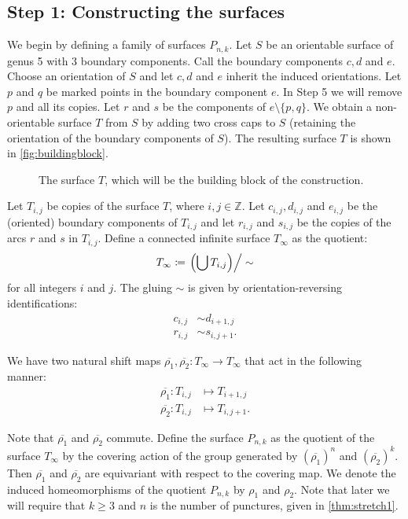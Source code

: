 \subsection*{Step 1: Constructing the surfaces}

We begin by defining a family of surfaces $P_{n,k}$. Let $S$ be an orientable surface of genus 5 with 3
boundary components.  Call the boundary components $c,d$ and $e$. Choose an orientation of $S$ and let $c,d$ and $e$ inherit the induced orientations. Let $p$ and $q$ be marked points in the boundary component $e$. In Step 5 we will remove $p$ and all its copies.  Let  $r$ and
$s$ be the components of $e\setminus\{p,q\}$. We obtain a non-orientable surface $T$ from $S$ by adding two cross caps to $S$ (retaining the orientation of the boundary components of $S$).  The resulting surface $T$ is shown in \autoref{fig:buildingblock}.

\begin{figure}[ht]
    \centering
    \caption{The surface $T$, which will be the building block of the construction.}
    \label{fig:buildingblock}
\end{figure}

Let $T_{i,j}$ be copies of the surface $T$, where $i,j \in \mathbb{Z}$. Let $c_{i,j}, d_{i,j}$ and $e_{i,j}$ be the (oriented) boundary components of $T_{i,j}$ and let $r_{i,j}$ and $s_{i,j}$ be the copies of the arcs $r$ and $s$ in $T_{i,j}$. Define a connected infinite surface $T_\infty$ as the quotient:
\begin{align*}
  T_\infty \coloneqq \left. \left( \bigcup T_{i,j} \right)\right/\sim
\end{align*}
for all integers $i$ and $j$. The gluing $\sim$ is given by orientation-reversing identifications:
\begin{align}
  c_{i,j} &\sim d_{i+1,j} \label{identification1}\\
  r_{i,j} &\sim s_{i,j+1}.\label{identification2}
\end{align}

We have two
natural shift maps $\overline{\rho_1},\overline{\rho_2}: T_\infty \to T_\infty$ that act in the
following manner:
\begin{align*}
  \overline{\rho_1}: T_{i,j} &\mapsto T_{i+1, j} \\
  \overline{\rho_2}: T_{i,j} &\mapsto T_{i, j+1}.
\end{align*}

Note that $\overline{\rho_1}$ and $\overline{\rho_2}$ commute. Define the surface $P_{n,k}$ as the quotient of the surface $T_\infty$ by the
covering action of the group generated by $(\overline{\rho_1})^n$ and $(\overline{\rho_2})^k$. Then
$\overline{\rho_1}$ and $\overline{\rho_2}$ are equivariant with respect to the covering map.  We denote the induced homeomorphisms of the quotient $P_{n,k}$ by $\rho_1$
and $\rho_2$.  Note that later we will require that $k\geq 3$ and $n$ is the number of punctures, given in \autoref{thm:stretch1}.

